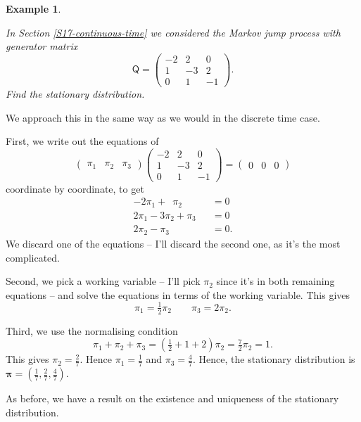 \documentclass[
  a4paper,
]{article}
\theoremstyle{definition}
\theoremstyle{definition}
\newtheorem{example}{Example}[section]
\theoremstyle{definition}
\theoremstyle{remark}
\begin{document}
\begin{example}
\protect\hypertarget{exm:stat-cont-ex}{}\label{exm:stat-cont-ex}

\emph{In Section \ref{S17-continuous-time} we considered the Markov jump process with generator matrix}
\[ \mathsf Q = \begin{pmatrix} -2 & 2 & 0 \\
 1 & -3 & 2 \\
 0 & 1 & -1 \end{pmatrix} . \]
\emph{Find the stationary distribution.}

We approach this in the same way as we would in the discrete time case.

First, we write out the equations of
\[ \begin{pmatrix} \pi_1 & \pi_2 & \pi_3 \end{pmatrix}\begin{pmatrix} -2 & 2 & 0 \\
 1 & -3 & 2 \\
 0 & 1 & -1 \end{pmatrix} = \begin{pmatrix} 0 & 0 & 0 \end{pmatrix}    \]
coordinate by coordinate, to get
\begin{align*}
    -2\pi_1 + \phantom{2}\pi_2 \phantom{{}+\pi_3} &= 0 \\
    2\pi_1 - 3\pi_2 + \pi_3 &= 0 \\
    2\pi_2 - \pi_3 &= 0 .
\end{align*}
We discard one of the equations -- I'll discard the second one, as it's the most complicated.

Second, we pick a working variable -- I'll pick \(\pi_2\) since it's in both remaining equations -- and solve the equations in terms of the working variable. This gives
\[ \pi_1 = \tfrac12 \pi_2 \qquad \pi_3 = 2 \pi_2 . \]

Third, we use the normalising condition
\[ \pi_1 + \pi_2 + \pi_3 = \left(\tfrac12 + 1 + 2\right)\pi_2 = \tfrac72 \pi_2 = 1 . \]
This gives \(\pi_2 = \frac27\). Hence \(\pi_1 = \frac17\) and \(\pi_3 = \frac47\). Hence, the stationary distribution is \(\boldsymbol\pi = (\frac17, \frac27, \frac47)\).

\end{example}

As before, we have a result on the existence and uniqueness of the stationary distribution.
\end{document}
